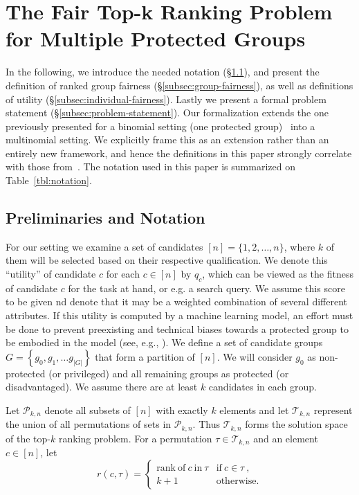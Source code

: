 
\section{The Fair Top-k Ranking Problem for Multiple Protected Groups}\label{sec:problem}

In the following, we introduce the needed notation (\S\ref{subsec:preliminaries}), and present the definition of ranked group fairness (\S\ref{subsec:group-fairness}), as well as definitions of utility (\S\ref{subsec:individual-fairness}). Lastly we present a formal problem statement (\S\ref{subsec:problem-statement}).
%
Our formalization extends the one previously presented for a binomial setting (one protected group)~\cite{zehlike2017fair} into a multinomial setting.
%
We explicitly frame this as an extension rather than an entirely new framework, and hence the definitions in this paper strongly correlate with those from~\cite{zehlike2017fair}.
%
The notation used in this paper is summarized on Table~\ref{tbl:notation}.

\subsection{Preliminaries and Notation}
\label{subsec:preliminaries}
For our setting we examine a set of candidates $[n] = \{ 1, 2, \dots, n \}$, where $k$ of them will be selected based on their respective qualification. We denote this ``utility'' of candidate $c$ for each $c \in [n]$ by $q_c$, which can be viewed as the fitness of candidate $c$ for the task at hand, or e.g. a search query. We assume this score to be given nd denote that it may be a weighted combination of several different attributes.
%
If this utility is computed by a machine learning model, an effort must be done to prevent preexisting and technical biases towards a protected group to be embodied in the model (see, e.g., \cite{Sweeney2013}).
%
We define a set of candidate groups $G = \left\{g_0, g_1, \ldots g_{|G|}\right\}$ that form a partition of $[n]$. We will consider $g_0$ as non-protected (or privileged) and all remaining groups as protected (or disadvantaged).
%
We assume there are at least $k$ candidates in each group. %

Let ${\mathcal P}_{k,n}$ denote all subsets of $[n]$ with exactly $k$ elements and let ${\mathcal T}_{k,n}$ represent the union of all permutations of sets in ${\mathcal P}_{k,n}$.
%
Thus ${\mathcal T}_{k,n}$ forms the solution space of the top-$k$ ranking problem.
%
For a permutation $\tau \in {\mathcal T}_{k,n}$ and an element $c \in [n]$, let
\[
r(c, \tau) = \begin{cases}
\mathrm{rank~of~} c \mathrm{~in~} \tau & \mathrm{if~} c \in \tau~, \\
k + 1 & \mathrm{otherwise}.
\end{cases}
\]

